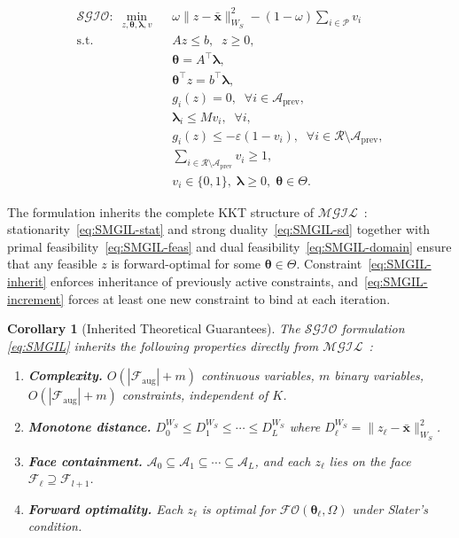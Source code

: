 \documentclass[journal]{IEEEtran}
\newtheorem{corollary}{Corollary}
\newcommand{\MGIL}{\mathcal{MGIL}}
\newcommand{\SGIO}{\mathcal{SGIO}}
\newcommand{\FO}{\mathcal{FO}}
\newcommand{\Faug}{\mathcal{F}_{\mathrm{aug}}}
\newcommand{\btheta}{\boldsymbol{\theta}}
\newcommand{\blambda}{\boldsymbol{\lambda}}
\newcommand{\bW}{W_S}
\newcommand{\xbar}{\bar{\mathbf{x}}}
\newcommand{\cR}{\mathcal{R}}
\newcommand{\cP}{\mathcal{P}}
\newcommand{\cA}{\mathcal{A}}
\begin{document}
\begin{subequations}\label{eq:SMGIL}
\begin{align}
\SGIO:\;\min_{z,\btheta,\blambda,v}\;\;
& \omega \| z - \xbar \|_{\bW}^2
- (1-\omega)\sum_{i \in \cP} v_i
\label{eq:SMGIL-obj}\\
\text{s.t.}\;\;
& Az \leq b,\;\; z \geq 0,
\label{eq:SMGIL-feas}\\
& \btheta = A^\top \blambda,
\label{eq:SMGIL-stat}\\
& \btheta^\top z = b^\top \blambda,
\label{eq:SMGIL-sd}\\
& g_i(z) = 0,\;\; \forall i \in \cA_{\mathrm{prev}},
\label{eq:SMGIL-inherit}\\
& \blambda_i \leq M v_i,\;\; \forall i,
\label{eq:SMGIL-comp}\\
& g_i(z) \leq -\varepsilon(1-v_i),\;\;
  \forall i \in \cR\setminus\cA_{\mathrm{prev}},
\label{eq:SMGIL-slack}\\
& \sum_{i \in \cR\setminus\cA_{\mathrm{prev}}} v_i \geq 1,
\label{eq:SMGIL-increment}\\
& v_i \in \{0,1\},\;\blambda \geq 0,\;\btheta \in \Theta.
\label{eq:SMGIL-domain}
\end{align}
\end{subequations}

The formulation inherits the complete KKT structure of
$\MGIL$~\cite{ahmadi2024IL}: stationarity~\eqref{eq:SMGIL-stat} and
strong duality~\eqref{eq:SMGIL-sd} together with primal
feasibility~\eqref{eq:SMGIL-feas} and dual
feasibility~\eqref{eq:SMGIL-domain} ensure that any feasible $z$ is
forward-optimal for some $\btheta \in \Theta$.
Constraint~\eqref{eq:SMGIL-inherit} enforces inheritance of previously
active constraints, and~\eqref{eq:SMGIL-increment} forces at least one
new constraint to bind at each iteration.

\begin{corollary}[Inherited Theoretical Guarantees]
\label{thm:inherited}
The $\SGIO$ formulation \eqref{eq:SMGIL} inherits the following
properties directly from $\MGIL$~\cite{ahmadi2024IL}:
\begin{enumerate}
\item[(i)] \textbf{Complexity.} $O(|\Faug| + m)$ continuous variables,
$m$ binary variables, $O(|\Faug| + m)$ constraints, independent of $K$.
\item[(ii)] \textbf{Monotone distance.}
$D^{\bW}_0 \leq D^{\bW}_1 \leq \cdots \leq D^{\bW}_L$ where
$D^{\bW}_\ell = \|z_\ell - \xbar\|_{{\bW}}^2$.
\item[(iii)] \textbf{Face containment.}
$\cA_0 \subseteq \cA_1 \subseteq \cdots \subseteq \cA_L$, and each
$z_\ell$ lies on the face $\mathcal{F}_\ell \supseteq \mathcal{F}_{l+1}$.
\item[(iv)] \textbf{Forward optimality.} Each $z_\ell$ is optimal for
$\FO(\btheta_\ell, \Omega)$ under Slater's condition.
\end{enumerate}
\end{corollary}
\end{document}

